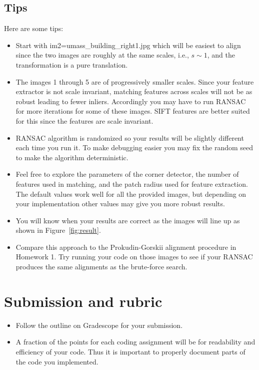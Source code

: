 \documentclass[10pt,letterpaper]{article}
\begin{document}
\subsection{Tips}
Here are some tips:
\begin{itemize}
\item Start with im2=umass\_building\_right1.jpg which will be easiest to align since the two images are roughly at the same scales, i.e., $s\sim1$, and the transformation is a pure translation.
\item The images 1 through 5 are of progressively smaller scales. Since your feature extractor is not scale invariant, matching features across scales will not be as robust leading to fewer inliers. 
Accordingly you may have to run RANSAC for more iterations for some of these images.
SIFT features are better suited for this since the features are scale invariant.
\item RANSAC algorithm is randomized so your results will be slightly different each time you run it.
To make debugging easier you may fix the random seed to make the algorithm deterministic.
\item Feel free to explore the parameters of the corner detector, the number of features used in matching, and the patch radius used for feature extraction. The default values work well for all the provided images, but depending on your implementation other values may give you more robust results.
\item You will know when your results are correct as the images will line up as shown in Figure~\ref{fig:result}.
\item Compare this approach to the Prokudin-Gorskii alignment procedure in Homework 1. Try running your code on those images to see if your RANSAC produces the same alignments as the brute-force search.
\end{itemize}

\section{Submission and rubric}

\begin{itemize}
\item Follow the outline on Gradescope for your submission. 
\item A fraction of the points for each coding assignment will be for
  readability and efficiency of your code. Thus it is important to
  properly document parts of the code you implemented.
\end{itemize}
\end{document}
